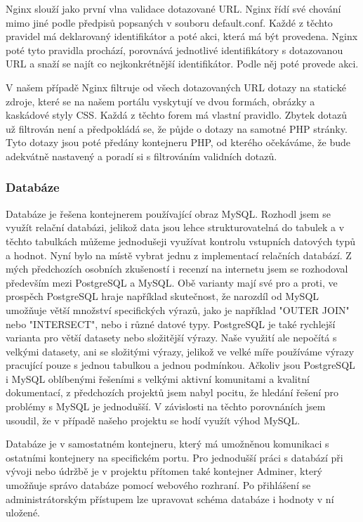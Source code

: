 Nginx slouží jako první vlna validace dotazované URL. Nginx řídí své chování mimo jiné podle předpisů popsaných v souboru default.conf. Každé z těchto pravidel má deklarovaný identifikátor a poté akci, která má být provedena. Nginx poté tyto pravidla prochází, porovnává jednotlivé identifikátory s dotazovanou URL a snaží se najít co nejkonkrétnější identifikátor. Podle něj poté provede akci.

V našem případě Nginx filtruje od všech dotazovaných URL dotazy na statické zdroje, které se na našem portálu vyskytují ve dvou formách, obrázky a kaskádové styly CSS. Každá z těchto forem má vlastní pravidlo. Zbytek dotazů už filtrován není a předpokládá se, že půjde o dotazy na samotné PHP stránky. Tyto dotazy jsou poté předány kontejneru PHP, od kterého očekáváme, že bude adekvátně nastavený a poradí si s filtrováním validních dotazů.

\subsubsection{Databáze}
Databáze je řešena kontejnerem používající obraz MySQL. Rozhodl jsem se využít relační databázi, jelikož data jsou lehce strukturovatelná do tabulek a v těchto tabulkách můžeme jednodušeji využívat kontrolu vstupních datových typů a hodnot. Nyní bylo na místě vybrat jednu z implementací relačních databází. Z mých předchozích osobních zkušeností i recenzí na internetu jsem se rozhodoval především mezi PostgreSQL a MySQL. Obě varianty mají své pro a proti, ve prospěch PostgreSQL hraje například skutečnost, že narozdíl od MySQL umožňuje větší množství specifických výrazů, jako je například "OUTER JOIN" nebo "INTERSECT", nebo i různé datové typy. PostgreSQL je také rychlejší varianta pro větší datasety nebo složitější výrazy. Naše využití ale nepočítá s velkými datasety, ani se složitými výrazy, jelikož ve velké míře používáme výrazy pracující pouze s jednou tabulkou a jednou podmínkou. Ačkoliv jsou PostgreSQL i MySQL oblíbenými řešeními s velkými aktivní komunitami a kvalitní dokumentací, z předchozích projektů jsem nabyl pocitu, že hledání řešení pro problémy s MySQL je jednodušší. V závislosti na těchto porovnáních jsem usoudil, že v případě našeho projektu se hodí využít výhod MySQL.

Databáze je v samostatném kontejneru, který má umožněnou komunikaci s ostatními kontejnery na specifickém portu. Pro jednodušší práci s databází při vývoji nebo údržbě je v projektu přítomen také kontejner Adminer, který umožňuje správo databáze pomocí webového rozhraní. Po přihlášení se administrátorským přístupem lze upravovat schéma databáze i hodnoty v ní uložené.

